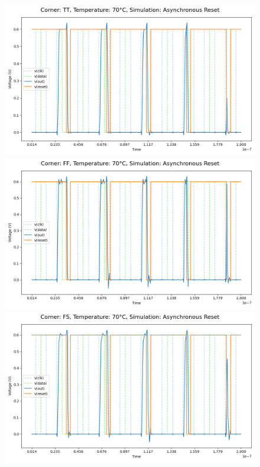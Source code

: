 \begin{figure}[H]
    \centering
    \includegraphics[height= 0.21\textheight]{figures/aimspice/TT/70/W2.csv.png}
    \vspace{5pt}
    \includegraphics[height= 0.21\textheight]{figures/aimspice/FF/70/W2.csv.png}
    \vspace{5pt}
    \includegraphics[height= 0.21\textheight]{figures/aimspice/FS/70/W2.csv.png}

\end{figure}
